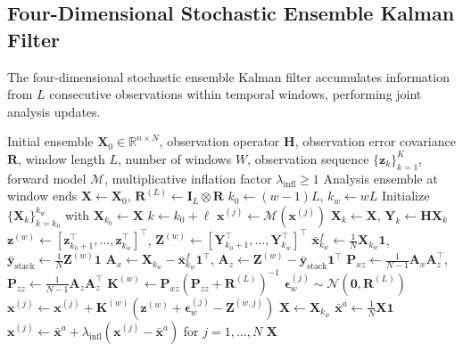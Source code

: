 \documentclass[11pt,a4paper]{article}
\begin{document}
\subsection{Four-Dimensional Stochastic Ensemble Kalman Filter}\label{app:4d_enkf}

The four-dimensional stochastic ensemble Kalman filter accumulates information from $L$ consecutive observations within temporal windows, performing joint analysis updates.

\begin{algorithm}[H]
\caption{Four-Dimensional Stochastic Ensemble Kalman Filter}
\label{alg:4d_enkf_appendix}
\begin{algorithmic}[1]
\Require Initial ensemble $\mathbf{X}_0 \in \mathbb{R}^{n \times N}$, observation operator $\mathbf{H}$, observation error covariance $\mathbf{R}$, window length $L$, number of windows $W$, observation sequence $\{\mathbf{z}_k\}_{k=1}^{K}$, forward model $\mathcal{M}$, multiplicative inflation factor $\lambda_{\mathrm{infl}} \geq 1$
\Ensure Analysis ensemble at window ends
\State $\mathbf{X} \gets \mathbf{X}_0$, \quad $\mathbf{R}^{(L)} \gets \mathbf{I}_L \otimes \mathbf{R}$
    \State $k_0 \gets (w-1)L$, \quad $k_w \gets wL$ 
    \State Initialize $\{\mathbf{X}_k\}_{k=k_0}^{k_w}$ with $\mathbf{X}_{k_0} \gets \mathbf{X}$
        \State $k \gets k_0 + \ell$
            \State $\mathbf{x}^{(j)} \gets \mathcal{M}(\mathbf{x}^{(j)})$
        \EndFor
        \State $\mathbf{X}_k \gets \mathbf{X}$, \quad $\mathbf{Y}_k \gets \mathbf{H}\mathbf{X}_k$
    \EndFor
    \State $\mathbf{z}^{(w)} \gets [\mathbf{z}_{k_0+1}^{\top}, \ldots, \mathbf{z}_{k_w}^{\top}]^{\top}$, \quad $\mathbf{Z}^{(w)} \gets [\mathbf{Y}_{k_0+1}^{\top}, \ldots, \mathbf{Y}_{k_w}^{\top}]^{\top}$
    \State $\bar{\mathbf{x}}_{k_w}^f \gets \frac{1}{N}\mathbf{X}_{k_w}\mathbf{1}$, \quad $\bar{\mathbf{y}}_{\mathrm{stack}} \gets \frac{1}{N}\mathbf{Z}^{(w)}\mathbf{1}$ 
    \State $\mathbf{A}_x \gets \mathbf{X}_{k_w} - \bar{\mathbf{x}}_{k_w}^f\mathbf{1}^{\top}$, \quad $\mathbf{A}_z \gets \mathbf{Z}^{(w)} - \bar{\mathbf{y}}_{\mathrm{stack}}\mathbf{1}^{\top}$ 
    \State $\mathbf{P}_{xz} \gets \frac{1}{N-1}\mathbf{A}_x\mathbf{A}_z^{\top}$, \quad $\mathbf{P}_{zz} \gets \frac{1}{N-1}\mathbf{A}_z\mathbf{A}_z^{\top}$
    \State $\mathbf{K}^{(w)} \gets \mathbf{P}_{xz}(\mathbf{P}_{zz} + \mathbf{R}^{(L)})^{-1}$
        \State $\boldsymbol{\epsilon}_{w}^{(j)} \sim \mathcal{N}(\mathbf{0}, \mathbf{R}^{(L)})$
        \State $\mathbf{x}^{(j)} \gets \mathbf{x}^{(j)} + \mathbf{K}^{(w)}(\mathbf{z}^{(w)} + \boldsymbol{\epsilon}_{w}^{(j)} - \mathbf{Z}^{(w,j)})$ 
    \EndFor
    \State $\mathbf{X} \gets \mathbf{X}_{k_w}$
    \State $\bar{\mathbf{x}}^a \gets \frac{1}{N}\mathbf{X}\mathbf{1}$
    \State $\mathbf{x}^{(j)} \gets \bar{\mathbf{x}}^a + \lambda_{\mathrm{infl}}(\mathbf{x}^{(j)} - \bar{\mathbf{x}}^a)$ for $j=1,\ldots,N$ 
\EndFor
\State \Return $\mathbf{X}$
\end{algorithmic}
\end{algorithm}
\end{document}
